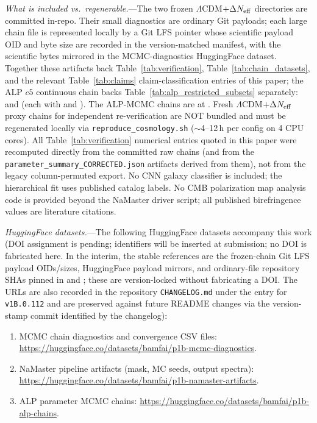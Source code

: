 \documentclass[aps,prd,twocolumn,superscriptaddress,showpacs,preprintnumbers,nofootinbib,longbibliography,floatfix]{revtex4-2}
\newcommand{\Neff}{N_{\rm eff}}
\newcommand{\paperVersion}{v1B.0.112}
\begin{document}
\textit{What is included vs.\ regenerable.}---The two frozen
$\Lambda$CDM$+\Delta\Neff$ directories are committed in-repo. Their small
diagnostics are ordinary Git payloads; each large chain file is represented
locally by a Git LFS pointer whose scientific payload OID and byte size are
recorded in the version-matched manifest, with the scientific bytes mirrored in the
MCMC-diagnostics HuggingFace dataset. Together these artifacts back
Table~\ref{tab:verification}, Table~\ref{tab:chain_datasets}, and the relevant
Table~\ref{tab:claims} claim-classification entries
of this paper; the ALP $c5$ continuous chain backs Table~\ref{tab:alp_restricted_subsets} separately:
 and
(each with  and
). The
ALP-MCMC chains are at
.
Fresh $\Lambda$CDM$+\Delta\Neff$ proxy chains for independent
re-verification are NOT bundled and must be regenerated locally via
\texttt{reproduce\_cosmology.sh} ($\sim$4--12\,h per config on 4 CPU cores).
All Table~\ref{tab:verification} numerical entries quoted in this paper were recomputed
directly from the committed raw chains (and from the
\texttt{parameter\_summary\_CORRECTED.json} artifacts derived from
them), not from the legacy column-permuted export.
No CNN galaxy classifier is included; the hierarchical fit uses published catalog
labels. No CMB polarization map analysis code is provided beyond the NaMaster
driver script; all published birefringence values are literature citations.

\textit{HuggingFace datasets.}---The following HuggingFace datasets accompany
this work (DOI assignment is pending; identifiers will be inserted at
submission; no DOI is fabricated here. In the interim, the stable references
are the frozen-chain Git LFS payload OIDs/sizes, HuggingFace payload mirrors,
and ordinary-file repository SHAs pinned in  and
; these are version-locked without fabricating a DOI.
The URLs are also recorded in the repository
\texttt{CHANGELOG.md} under the entry for \texttt{\paperVersion} and are
preserved against future README changes via the version-stamp commit
identified by the changelog):
\begin{enumerate}[leftmargin=*]
\item MCMC chain diagnostics and convergence CSV files:
  \url{https://huggingface.co/datasets/bamfai/p1b-mcmc-diagnostics}.
\item NaMaster pipeline artifacts (mask, MC seeds, output spectra):
  \url{https://huggingface.co/datasets/bamfai/p1b-namaster-artifacts}.
\item ALP parameter MCMC chains:
  \url{https://huggingface.co/datasets/bamfai/p1b-alp-chains}.
\end{enumerate}
\end{document}
